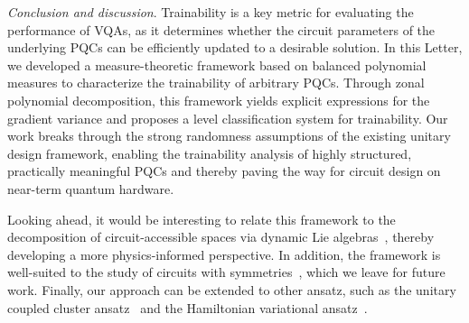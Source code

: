 \documentclass[%
 superscriptaddress,
 aps,prl,
 reprint,
 twocolumn,
 amsmath,amssymb,showpacs,
 bibnotes,
]{revtex4-2}
\begin{document}

\emph{Conclusion and discussion}.
Trainability is a key metric for evaluating the performance of VQAs, as it determines whether the circuit parameters of the underlying PQCs can be efficiently updated to a desirable solution. In this Letter, we developed a measure-theoretic framework based on balanced polynomial measures to characterize the trainability of arbitrary PQCs. Through zonal polynomial decomposition, this framework yields explicit expressions for the gradient variance and proposes a level classification system for trainability. Our work breaks through the strong randomness assumptions of the existing unitary design framework, enabling the trainability analysis of highly structured, practically meaningful PQCs and thereby paving the way for circuit design on near-term quantum hardware.

Looking ahead, it would be interesting to relate this framework to the decomposition of circuit-accessible spaces via dynamic Lie algebras~\cite{diaz2023showcasing,fontana2024characterizing,ragone2024lie}, thereby developing a more physics-informed perspective. In addition, the framework is well-suited to the study of circuits with symmetries~\cite{lee2018generalized,schatzki2024theoretical,marvian2024theory}, which we leave for future work. Finally, our approach can be extended to other ansatz, such as the unitary coupled cluster ansatz~\cite{taube2006new,filip2020stochastic,anand2022quantum} and the Hamiltonian variational ansatz~\cite{wecker2015progress,wiersema2020exploring}.
\end{document}
